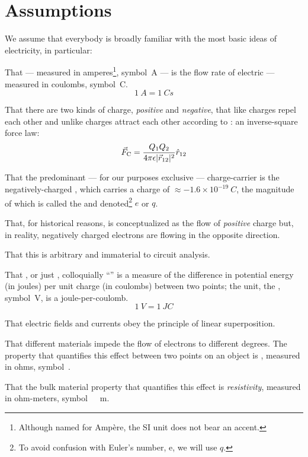\section{Assumptions}

We assume that everybody is broadly familiar with the most basic ideas
of electricity, in particular:

That  --- measured in amperes\footnote{Although named
  for Amp\`ere, the SI unit does not bear an accent.}, symbol~\unit{A}
--- is the flow rate of electric  --- measured in
coulombs, symbol~\unit{C}.
\[
1~\unit{A} = 1~\unit{C}{s}
\]

That there are two kinds of charge, \emph{positive} and
\emph{negative}, that like charges repel each other and unlike charges
attract each other according to : an
inverse-square force law:
\[
\vec{F}_\mathrm{C} = \frac{Q_1 Q_2}{4\pi\epsilon\lvert\vec{r}_{12}\rvert^2}\hat{r}_{12}
\]

That the predominant --- for our purposes exclusive --- charge-carrier
is the negatively-charged , which carries a charge of
$\approx-1.6\times 10^{-19}~\unit{C}$, the magnitude of which is called the
 and denoted\footnote{To avoid confusion with
  Euler's number, $\mathrm{e}$, we will use $q$.} $e$ or $q$.

That, for historical reasons,  is
conceptualized as the flow of \emph{positive} charge but, in reality,
negatively charged electrons are flowing in the opposite direction.

That this is arbitrary and immaterial to circuit analysis.

That , or just , colloquially ``'' is a measure of the
difference in potential energy (in joules) per unit charge (in
coulombs) between two points; the unit, the ,
symbol~\unit{V}, is a joule-per-coulomb.
\[
1~\unit{V} = 1~\unit{J}{C}
\]

That electric fields and currents obey the principle of linear
superposition.

That different materials impede the flow of electrons to different
degrees. The property that quantifies this effect between two points
on an object is , measured in ohms, symbol~\unit{\Omega}.

That the bulk material property that quantifies this effect is
\emph{resistivity}, measured in ohm-meters, symbol~\unit{\Omega\cdot m}.

